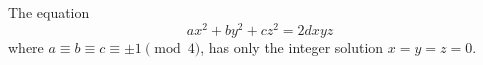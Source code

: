 \begin{proposition}
    The equation
\[
    ax^2+by^2+cz^2=2dxyz
\]
    where $a\equiv b\equiv c\equiv\pm1\pmod4$, has only the integer solution $x=y=z=0$.
\end{proposition}
